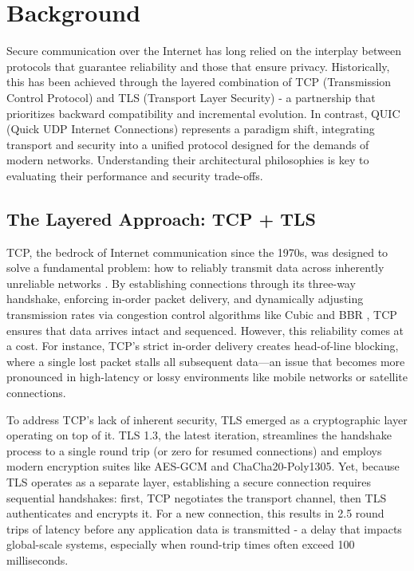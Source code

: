 \section{Background}  
Secure communication over the Internet has long relied on the interplay between protocols that guarantee reliability and those that ensure privacy. Historically, this has been achieved through the layered combination of TCP (Transmission Control Protocol) and TLS (Transport Layer Security) - a partnership that prioritizes backward compatibility and incremental evolution. In contrast, QUIC (Quick UDP Internet Connections) represents a paradigm shift, integrating transport and security into a unified protocol designed for the demands of modern networks. Understanding their architectural philosophies is key to evaluating their performance and security trade-offs.

\subsection{The Layered Approach: TCP + TLS}
TCP, the bedrock of Internet communication since the 1970s, was designed to solve a fundamental problem: how to reliably transmit data across inherently unreliable networks \cite{postel1981rfc0793}. By establishing connections through its three-way handshake, enforcing in-order packet delivery, and dynamically adjusting transmission rates via congestion control algorithms like Cubic and BBR \cite{allman2009tcp, cardwell2016bbr}, TCP ensures that data arrives intact and sequenced. However, this reliability comes at a cost. For instance, TCP's strict in-order delivery creates head-of-line blocking, where a single lost packet stalls all subsequent data—an issue that becomes more pronounced in high-latency or lossy environments like mobile networks or satellite connections.

To address TCP's lack of inherent security, TLS emerged as a cryptographic layer operating on top of it. TLS 1.3, the latest iteration, streamlines the handshake process to a single round trip (or zero for resumed connections) and employs modern encryption suites like AES-GCM and ChaCha20-Poly1305. Yet, because TLS operates as a separate layer, establishing a secure connection requires sequential handshakes: first, TCP negotiates the transport channel, then TLS authenticates and encrypts it. For a new connection, this results in 2.5 round trips of latency before any application data is transmitted - a delay that impacts global-scale systems, especially when round-trip times often exceed 100 milliseconds.

